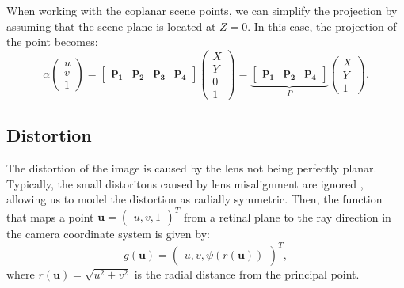 When working with the coplanar scene points, we can simplify the projection
by assuming that the scene plane is located at \(Z = 0\). In this case, the
projection of the point becomes:
\begin{equation}
	\alpha \begin{pmatrix}
		u \\ v \\ 1
	\end{pmatrix} = \begin{bmatrix}
		\mathbf{p_1} & \mathbf{p_2} & \mathbf{p_3} & \mathbf{p_4}
	\end{bmatrix} \begin{pmatrix}
		X \\ Y \\ 0 \\ 1
	\end{pmatrix} = \underbrace{\begin{bmatrix}
			\mathbf{p_1} & \mathbf{p_2} & \mathbf{p_4}
		\end{bmatrix}}_{P} \begin{pmatrix}
		X \\ Y \\ 1
	\end{pmatrix}.
\end{equation}

\subsection{Distortion}\label{sub:distortion}

The distortion of the image is caused by the lens not being perfectly planar.
Typically, the small distoritons caused by lens misalignment are ignored
, allowing us to model the distortion as radially symmetric.
Then, the function that maps a point \(\mathbf{u} = \begin{pmatrix}
	u, v, 1
\end{pmatrix}^{T}\) from a retinal plane  to the
ray direction in the camera coordinate system is given by:
\begin{equation}
	g(\mathbf{u}) = \begin{pmatrix}
		u, v, \psi(r(\mathbf{u}))
	\end{pmatrix}^{T},
\end{equation}
where \(r(\mathbf{u}) = \sqrt{u^2 + v^2}\) is the radial distance from the
principal point.

